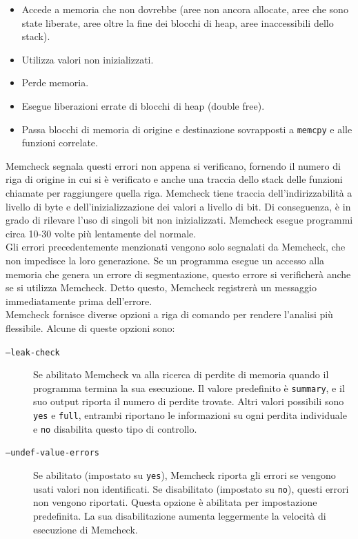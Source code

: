 \documentclass{article}
\begin{document}
\begin{itemize}
    \item Accede a memoria che non dovrebbe (aree non ancora allocate, aree che
    sono state liberate, aree oltre la fine dei blocchi di heap, aree inaccessibili dello stack).
    \item Utilizza valori non inizializzati.
    \item Perde memoria.
    \item Esegue liberazioni errate di blocchi di heap (double free).
    \item Passa blocchi di memoria di origine e destinazione sovrapposti a \texttt{memcpy}
    e alle funzioni correlate.
\end{itemize}

Memcheck segnala questi errori non appena si verificano, fornendo il numero di
riga di origine in cui si è verificato e anche una traccia dello stack delle
funzioni chiamate per raggiungere quella riga. Memcheck tiene traccia
dell'indirizzabilità a livello di byte e dell'inizializzazione dei valori a
livello di bit. Di conseguenza, è in grado di rilevare l'uso di singoli bit non
inizializzati.
Memcheck esegue programmi circa 10-30 volte più lentamente del normale. \\

Gli errori precedentemente menzionati vengono solo segnalati da Memcheck, che
non impedisce la loro generazione. Se un programma esegue un accesso alla
memoria che genera un errore di segmentazione, questo errore si verificherà anche se
si utilizza Memcheck. Detto questo, Memcheck registrerà un messaggio
immediatamente prima dell'errore. \\

Memcheck fornisce diverse opzioni a riga di comando per rendere l'analisi più flessibile. Alcune di queste opzioni sono:

\begin{description}
    \item[\texttt{--leak-check}] Se abilitato Memcheck va alla ricerca di perdite di memoria
    quando il programma termina la sua esecuzione. Il valore predefinito è
    \texttt{summary}, e il suo output riporta il numero di perdite trovate. Altri valori
    possibili sono \texttt{yes} e \texttt{full}, entrambi riportano le informazioni su ogni perdita
    individuale e \texttt{no} disabilita questo tipo di controllo.

    \item[\texttt{--undef-value-errors}] Se abilitato (impostato su \texttt{yes}), Memcheck riporta gli errori se vengono
    usati valori non identificati. Se disabilitato (impostato su \texttt{no}), questi
    errori non vengono riportati. Questa opzione è abilitata per impostazione
    predefinita. La sua disabilitazione aumenta leggermente la velocità di
    esecuzione di Memcheck.
\end{description}
\end{document}
